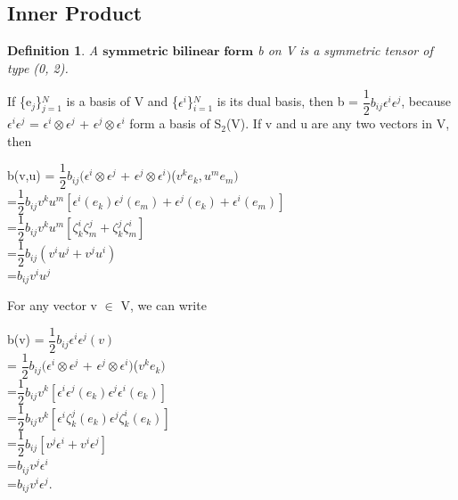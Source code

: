 \documentclass[12pt,a4paper]{article}
\newtheorem{defn}[thm]{Definition}
\begin{document}
\subsection{Inner Product}
\begin{defn}
A $\textbf{symmetric bilinear form}$ b on V is a symmetric tensor of type (0, 2).
\end{defn}
\indent If \{e$_j$\}$^N_{j=1}$ is a basis of V and \{$\epsilon^i$\}$^N_{i=1}$ is its dual basis, then b = $\dfrac{1}{2}b_{ij}\epsilon^i\epsilon^j$, because $\epsilon^i \epsilon^j $ = $\epsilon^i \otimes \epsilon^j$ + $\epsilon^j \otimes \epsilon^i$ form a basis of S$_2$(V). If v and u are any two vectors in V, then
\begin{center} \label{prop2}
b(v,u) = $\dfrac{1}{2}b_{ij}(\epsilon^i \otimes \epsilon^j$ + $\epsilon^j \otimes \epsilon^i)$($v^k e_k , u^m e_m)$\\
=$\dfrac{1}{2}b_{ij}v^k u^m [ \epsilon^i (e_k) \epsilon^j (e_m) + \epsilon^j (e_k) + \epsilon^i (e_m)]$\\
=$\dfrac{1}{2}b_{ij}v^k u^m [ \zeta_k^i \zeta_m^j + \zeta_k^j \zeta_m^i]$\\
=$ \dfrac{1}{2}b_{ij} ( v^i u ^j + v^j u^i)$ \\
=$ b_{ij} v^i u^j$\\
\end{center}
For any vector v $\in$ V, we can write
\begin{center}
b(v) = $\dfrac{1}{2}b_{ij} \epsilon^i \epsilon^j (v)$ \\
= $\dfrac{1}{2}b_{ij}(\epsilon^i \otimes \epsilon^j$ + $\epsilon^j \otimes \epsilon^i)$($v^k e_k )$\\
=$\dfrac{1}{2}b_{ij}v^k [ \epsilon^i \epsilon^j (e_k) \epsilon^j  \epsilon^i (e_k) ]$\\
=$\dfrac{1}{2}b_{ij}v^k [ \epsilon^i \zeta_k^j (e_k) \epsilon^j  \zeta^i_k (e_k) ]$\\
=$ \dfrac{1}{2}b_{ij} [ v^j \epsilon ^i + v^i \epsilon^j]$ \\
=$b_{ij}v^j\epsilon^i$\\
=$b_{ij}v^i\epsilon^j$.
\end{center}
\end{document}
